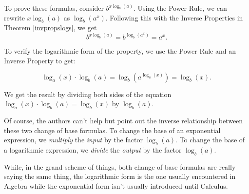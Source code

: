 \documentclass{ximera}
\begin{document}
To prove these formulas, consider $b^{x \log_{b}(a)}$. Using the Power Rule, we can rewrite $x \log_{b}(a)$ as $\log_{b}\left(a^{x}\right)$.  Following this with the Inverse Properties in Theorem \ref{invpropslogs}, we get \[ b^{x \log_{b}(a)} = b^{\log_{b}\left(a^{x}\right)} = a^{x}.\] 

 To verify the logarithmic form of the property, we use the Power Rule and an Inverse Property to get: 
 
  \[\log_{a}(x) \cdot \log_{b}(a) =  \log_{b} \left(a^{\log_{a}(x)}\right) = \log_{b}(x).\] 
  
 We get the result by dividing both sides of the equation $\log_{a}(x) \cdot \log_{b}(a)  =  \log_{b}(x)$ by  $\log_{b}(a)$.  
 
 \smallskip
 
 
 Of course, the authors can't help but point out the inverse relationship between these two change of base formulas.  To change the base of an exponential expression, we \textit{multiply} the \textit{input} by the factor $\log_{b}(a)$.  To change the base of a logarithmic expression, we \textit{divide} the \textit{output} by the factor $\log_{b}(a)$.  
 
 \smallskip
 
 
 While, in the grand scheme of things, both change of base formulas are really saying the same thing, the logarithmic form is the one usually encountered in Algebra while the exponential form isn't usually introduced until Calculus.

\smallskip
\end{document}
